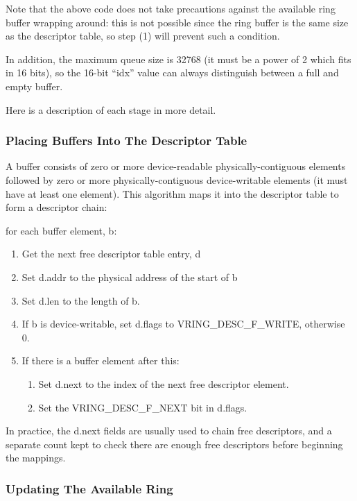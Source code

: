 Note that the above code does not take precautions against the
available ring buffer wrapping around: this is not possible since
the ring buffer is the same size as the descriptor table, so step
(1) will prevent such a condition.

In addition, the maximum queue size is 32768 (it must be a power
of 2 which fits in 16 bits), so the 16-bit “idx” value can always
distinguish between a full and empty buffer.

Here is a description of each stage in more detail.

\subsubsection{Placing Buffers Into The Descriptor Table}\label{sec:General Initialization And Device Operation / Device Operation / Supplying Buffers to The Device / Placing Buffers Into The Descriptor Table}

A buffer consists of zero or more device-readable physically-contiguous
elements followed by zero or more physically-contiguous
device-writable elements (it must have at least one element). This
algorithm maps it into the descriptor table to form a descriptor
chain:

for each buffer element, b:

\begin{enumerate}
\item Get the next free descriptor table entry, d
\item Set d.addr to the physical address of the start of b
\item Set d.len to the length of b.
\item If b is device-writable, set d.flags to VRING_DESC_F_WRITE,
    otherwise 0.
\item If there is a buffer element after this:
    \begin{enumerate}
    \item Set d.next to the index of the next free descriptor
      element.
    \item Set the VRING_DESC_F_NEXT bit in d.flags.
    \end{enumerate}
\end{enumerate}

In practice, the d.next fields are usually used to chain free
descriptors, and a separate count kept to check there are enough
free descriptors before beginning the mappings.

\subsubsection{Updating The Available Ring}\label{sec:General Initialization And Device Operation / Device Operation / Supplying Buffers to The Device / Updating The Available Ring}

